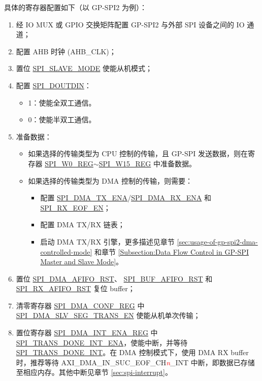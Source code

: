 \documentclass[main\_\_CN.tex]{subfiles}
\begin{document}
具体的寄存器配置如下（以 GP-SPI2 为例）：
\begin{enumerate}
    \item 经 IO MUX 或 GPIO 交换矩阵配置 GP-SPI2 与外部 SPI 设备之间的 IO 通道； 
    
    \item 配置 AHB 时钟 (AHB\_CLK)；

    \item 置位 \hyperref[fielddesc:SPISLAVEMODE]{SPI\_SLAVE\_MODE} 使能从机模式； 
    
    \item 配置 \hyperref[fielddesc:SPIDOUTDIN]{SPI\_DOUTDIN}：
    \begin{itemize}
        \item 1：使能全双工通信。
        \item 0：使能半双工通信。
    \end{itemize}
    
    \item 准备数据：
    \begin{itemize}
        \item 如果选择的传输类型为 CPU 控制的传输，且 GP-SPI 发送数据，则在寄存器 \hyperref[regdesc:SPIW0REG]{SPI\_W0\_REG}$\sim$\hyperref[regdesc:SPIW15REG]{SPI\_W15\_REG} 中准备数据。
        \item 如果选择的传输类型为 DMA 控制的传输，则需要：
        \begin{itemize}
            \item 配置 \hyperref[fielddesc:SPIDMATXENA]{SPI\_DMA\_TX\_ENA}/\hyperref[fielddesc:SPIDMARXENA]{SPI\_DMA\_RX\_ENA} 和 \hyperref[fielddesc:SPIRXEOFEN]{SPI\_RX\_EOF\_EN}；
            \item 配置 DMA TX/RX 链表；
            \item 启动 DMA TX/RX 引擎，更多描述见章节 \ref{sec:usage-of-gp-spi2-dma-controlled-mode} 和章节 \ref{Subsection:Data Flow Control in GP-SPI Master and Slave Mode}。
        \end{itemize}
    \end{itemize}
    
    \item 置位 \hyperref[fielddesc:SPIDMAAFIFORST]{SPI\_DMA\_AFIFO\_RST}、 \hyperref[fielddesc:SPIBUFAFIFORST]{SPI\_BUF\_AFIFO\_RST} 和 \hyperref[fielddesc:SPIRXAFIFORST]{SPI\_RX\_AFIFO\_RST} 复位 buffer；
    
    \item 清零寄存器 \hyperref[regdesc:SPIDMACONFREG]{SPI\_DMA\_CONF\_REG} 中 \hyperref[fielddesc:SPIDMASLVSEGTRANSEN]{SPI\_DMA\_SLV\_SEG\_TRANS\_EN} 使能从机单次传输；
    
    \item 置位寄存器 \hyperref[regdesc:SPIDMAINTENAREG]{SPI\_DMA\_INT\_ENA\_REG} 中 \hyperref[fielddesc:SPITRANSDONEINTENA]{SPI\_TRANS\_DONE\_INT\_ENA}，使能中断，并等待 \hyperref[int:SPITRANSDONEINT]{SPI\_TRANS\_DONE\_INT}。在 DMA 控制模式下，使用 DMA RX buffer 时，推荐等待 AXI\_DMA\_IN\_SUC\_EOF\_CH\textcolor{red}{\it{n}}\_INT  中断，即数据已存储至相应内存。其他中断见章节 \ref{sec:spi-interrupt}。
\end{enumerate}
\end{document}
